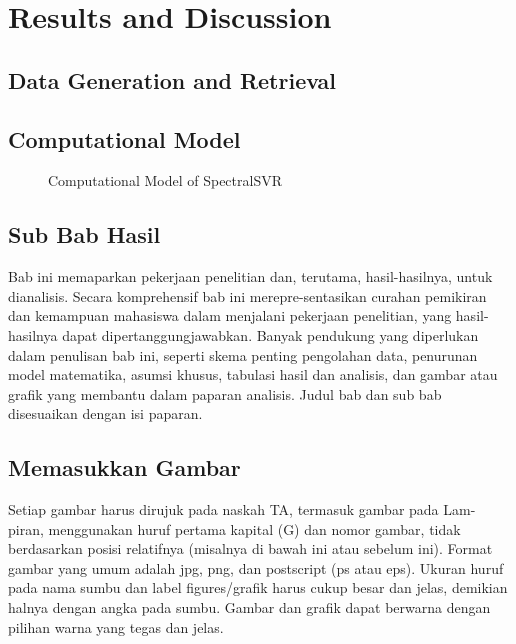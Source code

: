 \chapter{Results and Discussion}

\section{Data Generation and Retrieval}

\section{Computational Model}
\noindent

\begin{figure}
    \centering
    \begin{adjustbox}{max width=\textwidth}
    \end{adjustbox}
    \caption{Computational Model of SpectralSVR}\label{fig:computational_model}
\end{figure}

\section{Sub Bab Hasil}
\noindent Bab ini memaparkan pekerjaan penelitian dan, terutama, hasil-hasilnya, untuk dianalisis. Secara komprehensif bab ini merepre-sentasikan curahan pemikiran dan kemampuan mahasiswa dalam menjalani pekerjaan penelitian, yang hasil-hasilnya dapat dipertanggungjawabkan. Banyak pendukung yang diperlukan dalam penulisan bab ini, seperti skema penting pengolahan data, penurunan model matematika, asumsi khusus, tabulasi hasil dan analisis, dan gambar atau grafik yang membantu dalam paparan analisis. Judul bab dan sub bab disesuaikan dengan isi paparan.

\section{Memasukkan Gambar}
\noindent Setiap gambar harus dirujuk pada naskah TA, termasuk gambar pada Lam- piran, menggunakan huruf pertama kapital (G) dan nomor gambar, tidak berdasarkan posisi relatifnya (misalnya di bawah ini atau sebelum ini). Format gambar yang umum adalah jpg, png, dan postscript (ps atau eps). Ukuran huruf pada nama sumbu dan label figures/grafik harus cukup besar dan jelas, demikian halnya dengan angka pada sumbu. Gambar dan grafik dapat berwarna dengan pilihan warna yang tegas dan jelas.


